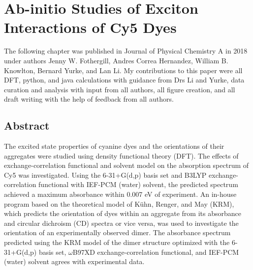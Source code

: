 \chapter{Ab-initio Studies of Exciton Interactions of Cy5 Dyes }
\label{chap:ab-initio}

The following chapter was published in Journal of Physical Chemistry A in 2018 under authors Jenny W. Fothergill, Andres Correa Hernandez, William B. Knowlton, Bernard Yurke, and Lan Li. My contributions to this paper were all DFT, python, and java calculations with guidance from Drs Li and Yurke, data curation and analysis with input from all authors, all figure creation, and all draft writing with the help of feedback from all authors.

\section{Abstract}

The excited state properties of cyanine dyes and the orientations of their aggregates were studied using density functional theory (DFT). The effects of exchange-correlation functional and solvent model on the absorption spectrum of Cy5 was investigated. Using the 6-31+G(d,p) basis set and B3LYP exchange-correlation functional with IEF-PCM (water) solvent, the predicted spectrum achieved a maximum absorbance within 0.007 eV of experiment. An in-house program based on the theoretical model of Kühn, Renger, and May (KRM), which predicts the orientation of dyes within an aggregate from its absorbance and circular dichroism (CD) spectra or vice versa, was used to investigate the orientation of an experimentally observed dimer. The absorbance spectrum predicted using the KRM model of the dimer structure optimized with the 6-31+G(d,p) basis set, $\omega$B97XD exchange-correlation functional, and IEF-PCM (water) solvent agrees with experimental data. 

